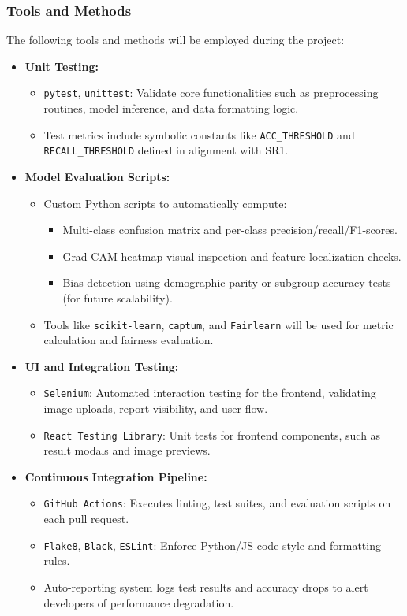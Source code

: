 \documentclass[12pt, titlepage]{article}
\begin{document}
\subsubsection{Tools and Methods}
The following tools and methods will be employed during the project:
\begin{itemize}
  \item \textbf{Unit Testing:}
    \begin{itemize}
      \item \texttt{pytest}, \texttt{unittest}: Validate core functionalities such as preprocessing routines, model inference, and data formatting logic.
      \item Test metrics include symbolic constants like \texttt{ACC\_THRESHOLD} and \texttt{RECALL\_THRESHOLD} defined in alignment with SR1.
    \end{itemize}
  \item \textbf{Model Evaluation Scripts:}
    \begin{itemize}
      \item Custom Python scripts to automatically compute:
        \begin{itemize}
          \item Multi-class confusion matrix and per-class precision/recall/F1-scores.
          \item Grad-CAM heatmap visual inspection and feature localization checks.
          \item Bias detection using demographic parity or subgroup accuracy tests (for future scalability).
        \end{itemize}
      \item Tools like \texttt{scikit-learn}, \texttt{captum}, and \texttt{Fairlearn} will be used for metric calculation and fairness evaluation.
    \end{itemize}
  \item \textbf{UI and Integration Testing:}
    \begin{itemize}
      \item \texttt{Selenium}: Automated interaction testing for the frontend, validating image uploads, report visibility, and user flow.
      \item \texttt{React Testing Library}: Unit tests for frontend components, such as result modals and image previews.
    \end{itemize}
  \item \textbf{Continuous Integration Pipeline:}
    \begin{itemize}
      \item \texttt{GitHub Actions}: Executes linting, test suites, and evaluation scripts on each pull request.
      \item \texttt{Flake8}, \texttt{Black}, \texttt{ESLint}: Enforce Python/JS code style and formatting rules.
      \item Auto-reporting system logs test results and accuracy drops to alert developers of performance degradation.
    \end{itemize}
\end{itemize}
\end{document}
